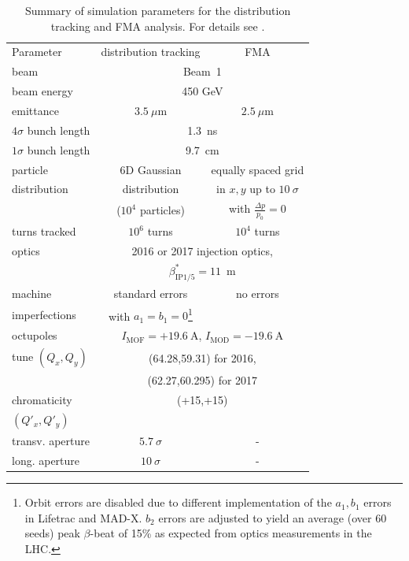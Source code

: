 \documentclass[%
 reprint,
 amsmath,amssymb,
 aps,
prstab,
longbibliography,
]{revtex4-1}
\begin{document}
\begin{table}[h]
	\caption{\label{tab:sim_param}%
		Summary of simulation parameters for the distribution tracking and FMA analysis. For details see \cite{md_sim_hel_res_ex_fitterer,resexmd2017}.
	}
	\begin{ruledtabular}
		\begin{tabular}{lcc}
			Parameter & distribution tracking & FMA \\
			\colrule
			beam &\multicolumn{2}{c}{Beam~1} \\
			beam energy &\multicolumn{2}{c}{450 GeV} \\
			emittance & $3.5~\mu$m& $2.5~\mu$m\\
			$4\sigma$ bunch length & \multicolumn{2}{c}{1.3~ns}\\
			$1\sigma$ bunch length & \multicolumn{2}{c}{9.7~cm}\\
			particle & 6D Gaussian & equally spaced grid\\
			distribution &  distribution & in $x,y$ up to $10~\sigma$\\
			&  ($10^4$ particles) & with $\frac{\Delta p}{p_0}=0$\\
			turns tracked & $10^6$ turns & $10^4$ turns \\\hline
			optics & \multicolumn{2}{c}{2016 or 2017 injection optics,}\\
			& \multicolumn{2}{c}{$\beta_{\mathrm{IP1/5}}^*=11$~m}\\
			machine  & standard errors & no errors \\
			imperfections &with $a_1=b_1=0$\footnote{Orbit errors are disabled due to different implementation of the $a_1,b_1$ errors in Lifetrac and MAD-X. $b_2$ errors are adjusted to yield an average (over 60 seeds) peak $\beta$-beat of 15\% as expected from optics measurements in the LHC.} &  \\
			octupoles  & \multicolumn{2}{c}{$I_{\mathrm{MOF}}=+19.6~\mathrm{A}$, $I_{\mathrm{MOD}}=-19.6~\mathrm{A}$}\\
			tune $(Q_x,Q_y)$ & \multicolumn{2}{c}{(64.28,59.31) for 2016,}\\
			& \multicolumn{2}{c}{(62.27,60.295) for 2017}\\
			chromaticity & \multicolumn{2}{c}{(+15,+15)}\\
			$(Q'_x,Q'_y)$ & & \\\hline
			transv. aperture & $5.7~\sigma$ & - \\
			long. aperture & $10~\sigma$ & - \\
		\end{tabular}
	\end{ruledtabular}
\end{table}
\end{document}
